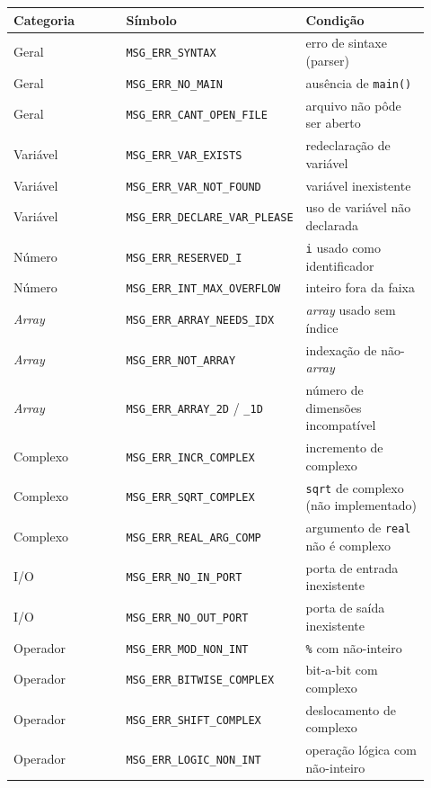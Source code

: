 \begin{longtable}{@{}p{0.30\linewidth}p{0.30\linewidth}p{0.32\linewidth}@{}}
\toprule
\textbf{Categoria} & \textbf{Símbolo} & \textbf{Condição} \\
\midrule
\endhead
Geral & \lstinline|MSG_ERR_SYNTAX| & erro de sintaxe (parser) \\
Geral & \lstinline|MSG_ERR_NO_MAIN| & ausência de \lstinline|main()| \\
Geral & \lstinline|MSG_ERR_CANT_OPEN_FILE| & arquivo não pôde ser aberto \\
Variável & \lstinline|MSG_ERR_VAR_EXISTS| & redeclaração de variável \\
Variável & \lstinline|MSG_ERR_VAR_NOT_FOUND| & variável inexistente \\
Variável & \lstinline|MSG_ERR_DECLARE_VAR_PLEASE| & uso de variável não declarada \\
Número & \lstinline|MSG_ERR_RESERVED_I| & \lstinline|i| usado como identificador \\
Número & \lstinline|MSG_ERR_INT_MAX_OVERFLOW| & inteiro fora da faixa \\
\emph{Array} & \lstinline|MSG_ERR_ARRAY_NEEDS_IDX| & \emph{array} usado sem índice \\
\emph{Array} & \lstinline|MSG_ERR_NOT_ARRAY| & indexação de não-\emph{array} \\
\emph{Array} & \lstinline|MSG_ERR_ARRAY_2D| / \lstinline|_1D| & número de dimensões incompatível \\
Complexo & \lstinline|MSG_ERR_INCR_COMPLEX| & incremento de complexo \\
Complexo & \lstinline|MSG_ERR_SQRT_COMPLEX| & \lstinline|sqrt| de complexo (não implementado) \\
Complexo & \lstinline|MSG_ERR_REAL_ARG_COMP| & argumento de \lstinline|real| não é complexo \\
I/O & \lstinline|MSG_ERR_NO_IN_PORT| & porta de entrada inexistente \\
I/O & \lstinline|MSG_ERR_NO_OUT_PORT| & porta de saída inexistente \\
Operador & \lstinline|MSG_ERR_MOD_NON_INT| & \lstinline|%| com não-inteiro \\
Operador & \lstinline|MSG_ERR_BITWISE_COMPLEX| & bit-a-bit com complexo \\
Operador & \lstinline|MSG_ERR_SHIFT_COMPLEX| & deslocamento de complexo \\
Operador & \lstinline|MSG_ERR_LOGIC_NON_INT| & operação lógica com não-inteiro \\

\end{longtable}
